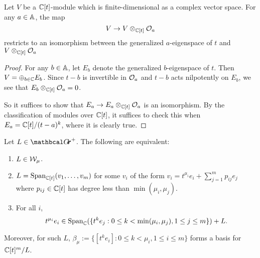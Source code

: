\documentclass[draft]{article} %
\begin{document}
\begin{lemma} 
\label{le:linalg} %
Let $ V $ be a $ \CC[t]$-module which is finite-dimensional as a complex vector space.  For any  $ a \in \AA$, the map
$$ 
    V  \rightarrow V \otimes_{\CC[t]} \cO_a
$$
restricts to an isomorphism between the generalized $ a $-eigenspace of $ t $ and $ V \otimes_{\CC[t]} \cO_a$
\end{lemma}
% 
\begin{proof}
    For any $ b \in \AA$, let $ E_b $ denote the generalized $b$-eigenspace of $t$.  Then $ V = \oplus_{b \in \CC} E_b$.  Since $ t - b$ is invertible in $ \cO_a$ and $ t -b $ acts nilpotently on $ E_b$, we see that $ E_b \otimes_{\CC[t]} \cO_a = 0 $.
    
    So it suffices to show that $ E_a \rightarrow E_a \otimes_{\CC[t]} \cO_a$ is an isomorphism.  By the classification of modules over $ \CC[t]$, it suffices to check this when  $ E_a = \CC[t]/(t-a)^k$, where it is clearly true.
\end{proof}
% 
\begin{lemma} 
\label{le:Wmu}
Let $ L \in \Grth^+$.  The following are equivalent:
\begin{enumerate}[label=(\roman*)]
    \item \label{it:slice} $ L \in \cW_\mu$.
    \item \label{it:basis} $ L = \Sp_{\CC[t]}(v_1, \dots, v_m)$ for some $ v_i $ of the form $ v_i = t^{\mu_i} e_i + \sum_{j=1}^m p_{ij} e_j $ where $ p_{ij} \in \CC[t] $ has degree less than $ \min(\mu_i, \mu_j)$.
    \item \label{it:t-act} For all $ i $, 
    $$ t^{\mu_i} e_i \in \Sp_\CC(\{t^k e_j : 0 \le k < \min(\mu_i, \mu_j), 1 \le j \le m \}) + L. $$
\end{enumerate}
Moreover, for such $L $, $ \beta_\mu := \{ [t^k e_i] : 0 \le k < \mu_i, 1 \le i \le m\}$ forms a basis for $ \CC[t]^m/L$. 
\end{lemma}
% 
% 
\end{document}
